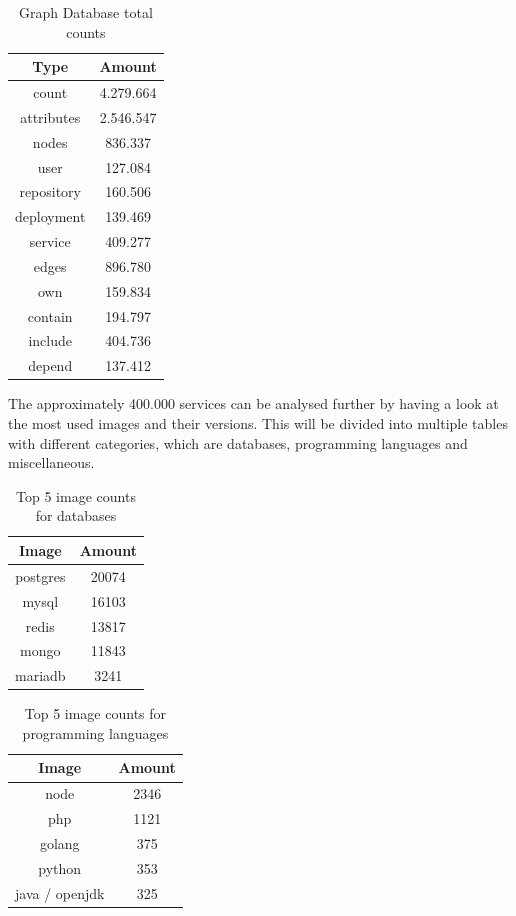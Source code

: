 \begin{table}[h!]
    \centering
    \begin{tabular}{ |c|c| }
    \hline
    Type & Amount \\
    \hline
         count & 4.279.664 \\
         attributes & 2.546.547 \\
         \hline
         nodes & 836.337 \\
         \hline
         user & 127.084 \\
         repository & 160.506\\
         deployment & 139.469\\
         service & 409.277\\
         \hline
         edges & 896.780 \\
         \hline
         own & 159.834 \\
         contain & 194.797 \\
         include & 404.736 \\
         depend & 137.412 \\
    \hline
    \end{tabular}
    \caption{Graph Database total counts}
    \label{graph_database_total_counts}
\end{table}

The approximately 400.000 services can be analysed further by having a look at the most used images and their versions. This will be divided into multiple tables with different categories, which are databases, programming languages and miscellaneous.

\begin{table}[h!]
    \centering
    \begin{tabular}{ |c|c| }
    \hline
    Image & Amount \\
    \hline
         postgres & 20074 \\
         mysql & 16103 \\
         redis & 13817 \\
         mongo & 11843 \\
         mariadb & 3241 \\
    \hline
    \end{tabular}
    \caption{Top 5 image counts for databases}
    \label{table_image_databases}
\end{table}

\begin{table}[h!]
    \centering
    \begin{tabular}{ |c|c| }
    \hline
    Image & Amount \\
    \hline
         node & 2346 \\
         php & 1121 \\
         golang & 375 \\
         python & 353 \\
         java / openjdk & 325 \\
    \hline
    \end{tabular}
    \caption{Top 5 image counts for programming languages}
    \label{table_image_languages}
\end{table}

